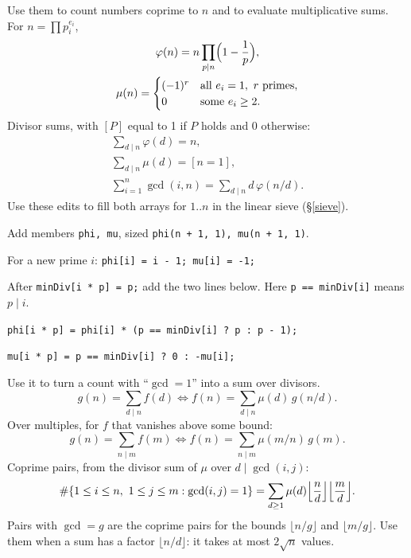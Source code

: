 {\footnotesize\tightdisplay
{}
Use them to count numbers coprime to $n$ and to evaluate multiplicative sums.
For $n = \prod p_i^{e_i}$,
\begin{gather*} \varphi(n) = n \prod_{p \mid n} \Bigl(1 - \frac{1}{p}\Bigr), \\ \mu(n) = \begin{cases} (-1)^r & \text{all } e_i = 1, \ r \text{ primes}, \\ 0 & \text{some } e_i \ge 2. \end{cases} \end{gather*}
Divisor sums, with $[P]$ equal to 1 if $P$ holds and 0 otherwise:
\begin{gather*} \sum_{d \mid n} \varphi(d) = n, \\ \sum_{d \mid n} \mu(d) = [n = 1], \\ \sum_{i=1}^{n} \gcd(i, n) = \sum_{d \mid n} d\, \varphi(n/d). \end{gather*}
Use these edits to fill both arrays for $1..n$ in the linear sieve (\S\ref{sieve}).
\begin{facts}
	\item Add members \texttt{phi, mu}, sized \texttt{phi(n + 1, 1), mu(n + 1, 1)}.
	\item For a new prime $i$: \texttt{phi[i] = i - 1; mu[i] = -1;}
	\item After \texttt{minDiv[i * p] = p;} add the two lines below. Here \texttt{p == minDiv[i]} means $p \mid i$.
	\item[] \texttt{phi[i * p] = phi[i] * (p == minDiv[i] ? p : p - 1);}
	\item[] \texttt{mu[i * p] = p == minDiv[i] ? 0 : -mu[i];}
\end{facts}
Use it to turn a count with ``$\gcd = 1$'' into a sum over divisors.
\[ g(n) = \sum_{d \mid n} f(d) \iff f(n) = \sum_{d \mid n} \mu(d)\, g(n/d). \]
Over multiples, for $f$ that vanishes above some bound:
\[ g(n) = \sum_{n \mid m} f(m) \iff f(n) = \sum_{n \mid m} \mu(m/n)\, g(m). \]
Coprime pairs, from the divisor sum of $\mu$ over $d \mid \gcd(i, j)$:
\[ \#\{1 \le i \le n,\ 1 \le j \le m : \gcd(i, j) = 1\} = \sum_{d \ge 1} \mu(d) \Bigl\lfloor \frac{n}{d} \Bigr\rfloor \Bigl\lfloor \frac{m}{d} \Bigr\rfloor. \]
Pairs with $\gcd = g$ are the coprime pairs for the bounds $\lfloor n/g \rfloor$ and $\lfloor m/g \rfloor$.
Use them when a sum has a factor $\lfloor n/d \rfloor$: it takes at most $2\sqrt{n}$ values.
\begin{facts}

\end{facts}}
